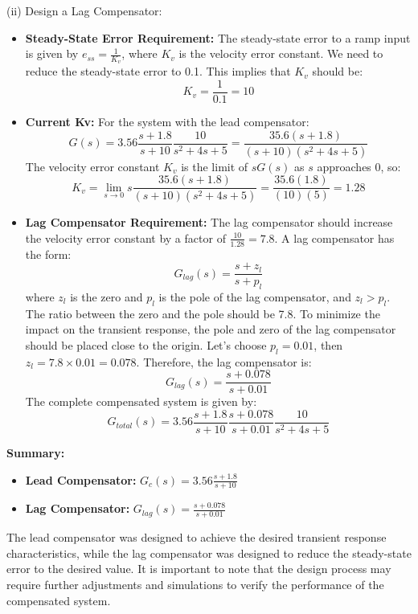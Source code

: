\begin{mdframed}[linecolor=gray!80!black, backgroundcolor=gray!10!white, linewidth=1pt, roundcorner=5pt, frametitle=Solution]
(ii) Design a Lag Compensator:

\begin{itemize}
    \item \textbf{Steady-State Error Requirement:} The steady-state error to a ramp input is given by \(e_{ss} = \frac{1}{K_v}\), where \(K_v\) is the velocity error constant. We need to reduce the steady-state error to 0.1. This implies that \(K_v\) should be:
    \[
    K_v = \frac{1}{0.1} = 10
    \]
    
    \item \textbf{Current Kv:} For the system with the lead compensator:
    \[
    G(s) = 3.56 \frac{s+1.8}{s+10} \frac{10}{s^2 + 4s + 5} = \frac{35.6(s+1.8)}{(s+10)(s^2+4s+5)}
    \]
    The velocity error constant \(K_v\) is the limit of \( sG(s) \) as \(s\) approaches 0, so:
    \[
    K_v = \lim_{s\to 0} s \frac{35.6(s+1.8)}{(s+10)(s^2+4s+5)} =  \frac{35.6(1.8)}{(10)(5)} = 1.28
    \]
    
    \item \textbf{Lag Compensator Requirement:} The lag compensator should increase the velocity error constant by a factor of \(\frac{10}{1.28} = 7.8\). A lag compensator has the form:
    \[
    G_{lag}(s) = \frac{s+z_l}{s+p_l}
    \]
    where \(z_l\) is the zero and \(p_l\) is the pole of the lag compensator, and \(z_l > p_l\). The ratio between the zero and the pole should be 7.8. To minimize the impact on the transient response, the pole and zero of the lag compensator should be placed close to the origin. Let's choose \(p_l = 0.01\), then \(z_l = 7.8\times0.01 = 0.078\). Therefore, the lag compensator is:
    \[
    G_{lag}(s) = \frac{s+0.078}{s+0.01}
    \]
    The complete compensated system is given by:
    \[
    G_{total}(s) = 3.56 \frac{s+1.8}{s+10}\frac{s+0.078}{s+0.01} \frac{10}{s^2 + 4s + 5}
    \]
\end{itemize}

\textbf{Summary:}
\begin{itemize}
    \item \textbf{Lead Compensator:} \( G_c(s) = 3.56 \frac{s+1.8}{s+10} \)
    \item \textbf{Lag Compensator:} \( G_{lag}(s) = \frac{s+0.078}{s+0.01} \)
\end{itemize}

The lead compensator was designed to achieve the desired transient response characteristics, while the lag compensator was designed to reduce the steady-state error to the desired value. It is important to note that the design process may require further adjustments and simulations to verify the performance of the compensated system.
\end{mdframed}
